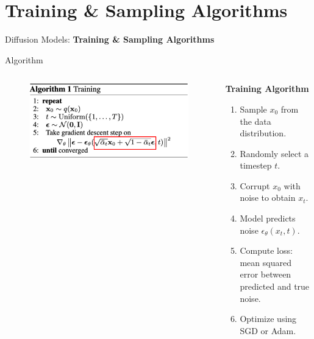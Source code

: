 \section{Training \& Sampling Algorithms}
\begin{frame}{}
    \LARGE Diffusion Models: \textbf{Training \& Sampling Algorithms}
\end{frame}

\begin{frame}[allowframebreaks]{Algorithm}
\begin{columns}
    \begin{column}{0.5\textwidth}
       \begin{figure}
            \centering
            \includegraphics[height=0.7\textheight, width=\textwidth, keepaspectratio]{images/diffusion/diff_5.png}
        \end{figure}
    \end{column}
    \begin{column}{0.5\textwidth}
        \textbf{Training Algorithm}
        \begin{enumerate}
            \item Sample $x_0$ from the data distribution.
            \item Randomly select a timestep $t$.
            \item Corrupt $x_0$ with noise to obtain $x_t$.
            \item Model predicts noise $\epsilon_\theta(x_t, t)$.
            \item Compute loss: mean squared error between predicted and true noise.
            \item Optimize using SGD or Adam.
        \end{enumerate}
    \end{column}
\end{columns}
    
\framebreak


\end{frame}
